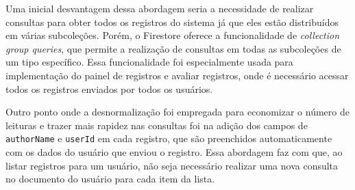 Uma inicial desvantagem dessa abordagem seria a necessidade de realizar 
consultas para obter todos os registros do sistema já que eles estão 
distribuídos em várias subcoleções.
Porém, o Firestore oferece a funcionalidade de \textit{collection group queries},
que permite a realização de consultas em todas as subcoleções de um tipo específico.
Essa funcionalidade foi especialmente usada para implementação do painel 
de registros e avaliar registros, onde é necessário acessar
todos os registros enviados por todos os usuários.

Outro ponto onde a desnormalização foi empregada para economizar o número de 
leituras e trazer mais rapidez nas consultas foi na adição dos campos de 
\texttt{authorName} e \texttt{userId}
em cada registro, que são preenchidos automaticamente com os dados do usuário
que enviou o registro. Essa abordagem faz com que, ao listar registros para um 
usuário, não seja necessário realizar uma nova consulta no documento do usuário 
para cada item da lista.

